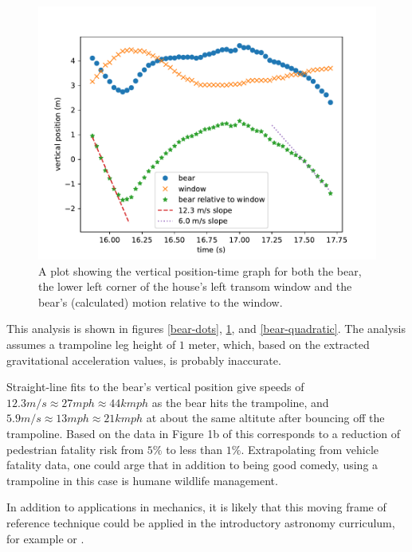 \documentclass[12pt]{iopart}
\begin{document}
\begin{figure}[ht]
\centering
\includegraphics[width=\columnwidth]{figure_7_bear-speed.pdf}
\caption{
A plot showing the vertical position-time graph for both the bear, the lower left corner of the house's left transom window and the bear's (calculated)  motion relative to the window. 
}
\label{bear-speed}
\end{figure}

This analysis is shown in figures \ref{bear-dots}, \ref{bear-speed}, and \ref{bear-quadratic}.
The analysis assumes a trampoline leg height of $1$ meter, which, based on the extracted gravitational acceleration values, is probably inaccurate.
 
 Straight-line fits to the bear's vertical position give speeds of $12.3m/s\approx27mph\approx44kmph$ as the bear hits the trampoline, and $5.9m/s\approx13mph\approx21kmph$ at about the same altitute after bouncing off the trampoline.  Based on the data in Figure 1b of \cite{AccidentRisk} this corresponds to a reduction of pedestrian fatality risk from $5\%$ to less than $1\%$.  Extrapolating from vehicle fatality data, one could arge that in addition to being good comedy, using a trampoline in this case is humane wildlife management.     
 
 In addition to applications in mechanics, it is likely that this moving frame of reference technique could be applied in the introductory astronomy curriculum, for example \cite{tracker_planets} or \cite{retrograde_planets}.
     
\end{document}

